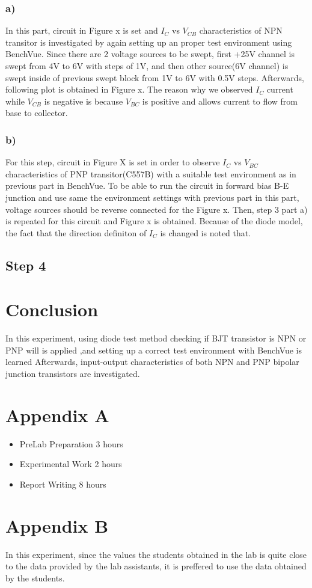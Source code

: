 \documentclass[letterpaper,12pt]{article}
\begin{document}
\subsubsection{a)} 
In this part, circuit in Figure x is set and \(I_C\) vs \(V_{CB}\) characteristics of NPN transitor is investigated by again setting up an proper test environment using BenchVue. 
Since there are 2 voltage sources to be swept, first +25V channel is swept from 4V to 6V with steps of 1V, and then other source(6V channel) is swept inside of previous swept block from 1V to 6V with 0.5V steps.  
Afterwards, following plot is obtained in Figure x. The reason why we observed \(I_C\) current while \(V_{CB}\) is negative is because \(V_{BC}\) is positive and allows current to flow from base to collector.
\subsubsection{b)}
For this step, circuit in Figure X is set in order to observe \(I_C\) vs \(V_{BC}\) characteristics of PNP transitor(C557B) with a suitable test environment as in previous part in BenchVue. To be able to run the circuit in forward bias B-E junction and use same the environment settings with previous part in this part, voltage sources should be reverse connected for the Figure x. Then, step 3 part a) is repeated for this circuit and Figure x is obtained. Because of the diode model, the fact that the direction definiton of \(I_C\) is changed is noted that. 
\subsection{Step 4}

\section{Conclusion}
In this experiment, using diode test method checking if BJT transistor is NPN or PNP will is applied ,and setting up a correct test environment with BenchVue is learned Afterwards, input-output characteristics of both NPN and PNP bipolar junction transistors are investigated.

\section*{Appendix A}
\begin{itemize}
    \item PreLab Preparation 3 hours
    \item Experimental Work 2  hours
    \item Report Writing 8 hours
\end{itemize}
\section*{Appendix B}
In this experiment, since the values the students obtained in the lab is quite close to the data provided by the lab assistants, it is preffered to use the data obtained by the students.
\end{document}
